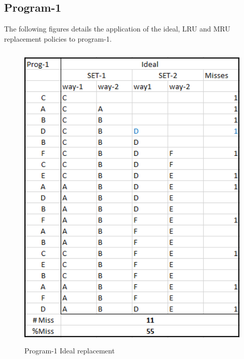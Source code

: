 \documentclass{tufte-handout}
\begin{document}
	\subsection{Program-1}
	The following figures details the application of the ideal, LRU and MRU replacement policies to program-1.
	\begin{figure}[h!]
	\label{fig:p1ideal}
	\centering
	\includegraphics[width = 6in, height = 6in]{p1ideal}
	\caption{Program-1 Ideal replacement}
	\end{figure}
	
\end{document}
